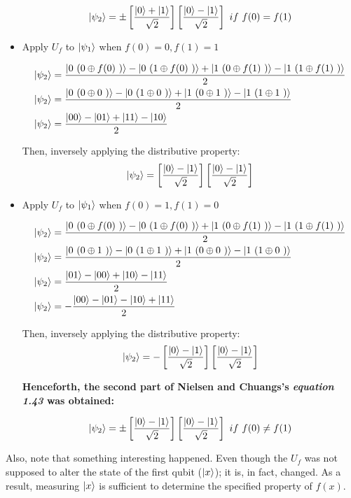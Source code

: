 \begin{itemize}
    \[
    \ket{\psi_2} = \pm \left[ \frac{\ket{0} + \ket{1}}{\sqrt{2}} \right]
        \left[ \frac{\ket{0} - \ket{1}}{\sqrt{2}} \right]\ if \ f(0) = f(1)
    \]
    
    \item Apply \(U_f\) to \(\ket{\psi_1}\) when \(f(0) = 0, f(1) = 1\)
    
        \begin{align}
        \ket{\psi_2} &= \frac{\ket{0\ (0 \oplus f(0)\ )} - \ket{0\ (1 \oplus f(0)\ )} +
        \ket{1\ (0 \oplus f(1)\ )} - \ket{1\ (1 \oplus f(1)\ )}}{2}
        \\
        \ket{\psi_2} &=  \frac{\ket{0\ (0 \oplus 0\ )} - \ket{0\ (1 \oplus 0\ )} +
        \ket{1\ (0 \oplus 1\ )} - \ket{1\ (1 \oplus 1\ )}}{2}
        \\
        \ket{\psi_2} &= \frac{\ket{00} - \ket{01} + \ket{11} - \ket{10}}{2}
    \end{align}
    
    Then, inversely applying the distributive property:
    \begin{equation}
        \ket{\psi_2} =
        \left[ \frac{\ket{0} - \ket{1}}{\sqrt{2}} \right]
        \left[ \frac{\ket{0} - \ket{1}}{\sqrt{2}} \right]
    \end{equation}
    
    \item Apply \(U_f\) to \(\ket{\psi_1}\) when \(f(0) = 1, f(1) = 0\)
    
        \begin{align}
        \ket{\psi_2} &= \frac{\ket{0\ (0 \oplus f(0)\ )} - \ket{0\ (1 \oplus f(0)\ )} +
        \ket{1\ (0 \oplus f(1)\ )} - \ket{1\ (1 \oplus f(1)\ )}}{2}
        \\
        \ket{\psi_2} &=  \frac{\ket{0\ (0 \oplus 1\ )} - \ket{0\ (1 \oplus 1\ )} +
        \ket{1\ (0 \oplus 0\ )} - \ket{1\ (1 \oplus 0\ )}}{2}
        \\
        \ket{\psi_2} &= \frac{\ket{01} - \ket{00} + \ket{10} - \ket{11}}{2}
        \\
        \ket{\psi_2} &= - \frac{\ket{00} - \ket{01} - \ket{10} + \ket{11}}{2}
    \end{align}
    
    Then, inversely applying the distributive property:
    \begin{equation}
        \ket{\psi_2} = -
        \left[ \frac{\ket{0} - \ket{1}}{\sqrt{2}} \right]
        \left[ \frac{\ket{0} - \ket{1}}{\sqrt{2}} \right]
    \end{equation}
    
    \textbf{Henceforth, the second part of Nielsen and Chuangs's \emph{equation 1.43} was obtained:}
    
    \[
    \ket{\psi_2} = \pm \left[ \frac{\ket{0} - \ket{1}}{\sqrt{2}} \right]
        \left[ \frac{\ket{0} - \ket{1}}{\sqrt{2}} \right]\ if \ f(0) \neq f(1)
    \]
\end{itemize}

Also, note that something interesting happened. Even though the \(U_f\) was not supposed to alter the state of the first qubit (\(\ket{x}\)); it is, in fact, changed. As a result, measuring \(\ket{x}\) is sufficient to determine the specified property of \(f(x)\).